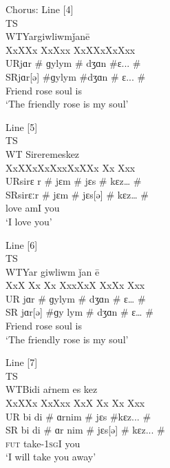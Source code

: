 \documentclass[output=paper,colorlinks,citecolor=brown]{langscibook}
\begin{document}
\begin{paperappendix}
\noindent Chorus: Line [4]\\
TS\tab    {}  \\      
WT\tab   Yar\tab    \tab  giwliwm\tab   ǰan\tab     ē\\
\tab \tab XxX\tab   \tab   Xx \tab  Xx\tab   Xxx \tab    XxX\tab     Xx\tab   Xx\tab   Xxx\\
UR\tab   jɑr \# \tab  \tab   ɡy\tab   lym \# \tab  dʒɑn \#\tab    ɛ... \#\\
SR\tab   jɑr[ə] \#\tab   ɡy\tab   lym \#\tab   dʒɑn \# \tab   ɛ... \#\\
\tab \tab Friend \tab \tab    rose  \tab \tab   soul  \tab   is\\
‘The friendly rose is my soul’\medskip

\noindent Line [5]\\
TS \tab   {} \\      
WT \tab  Sirer\tab  \tab      em\tab   es\tab    \tab  kez\\
\tab \tab XxX\tab     Xx\tab   Xx\tab   Xxx\tab  \tab    XxX\tab     Xx \tab  Xx \tab  Xxx\\
UR\tab   sirɛ \tab    r \# \tab  jɛm \#  \tab jɛs \#   \tab \tab   kɛz… \#\\
SR\tab   sirɛ\tab     ːr \# \tab  jɛm \#  \tab jɛs[ə] \# \tab   kɛz… \#\\
\tab \tab love  \tab  \tab    am\tab   I  \tab  \tab  you\\
‘I love you’\medskip

\noindent Line [6]\\
TS \tab  {} \\ 
WT\tab   Yar \tab   \tab  giwliwm \tab  ǰan  \tab   ē\\
\tab \tab XxX \tab   \tab  Xx \tab  Xx \tab  Xxx\tab     XxX \tab    Xx\tab   Xx  \tab Xxx \\    
UR  \tab jɑr \#   \tab\tab   ɡy\tab   lym \# \tab  dʒɑn \# \tab   ɛ… \#\\
SR \tab  jɑr[ə] \#\tab   ɡy \tab  lym \#  \tab dʒɑn \# \tab   ɛ… \#\\
\tab \tab Friend  \tab \tab   rose \tab \tab    soul \tab    is\\
‘The friendly rose is my soul’\medskip

\newpage
\noindent Line [7]\\
TS\tab   {}  \\ 
WT\tab   Bidi  \tab \tab   aṙnem \tab  \tab   es  \tab  \tab  kez\\
\tab \tab XxX\tab  \tab    Xx \tab  Xx\tab   Xxx   \tab \tab  XxX \tab    Xx \tab  Xx \tab Xxx   \\  
UR \tab  bi di \#  \tab \tab   ɑr\tab   nim \# \tab  jɛs \#\tab  \tab   kɛz... \#\\
SR \tab  bi di \#  \tab \tab   ɑr \tab  nim \# \tab  jɛs[ə] \# \tab  kɛz... \#\\
\tab \tab \textsc{fut} \tab  \tab   take-1\textsc{sg}\tab   I \tab  \tab   you\\
‘I will take you away’\medskip


\end{paperappendix}
\end{document}
